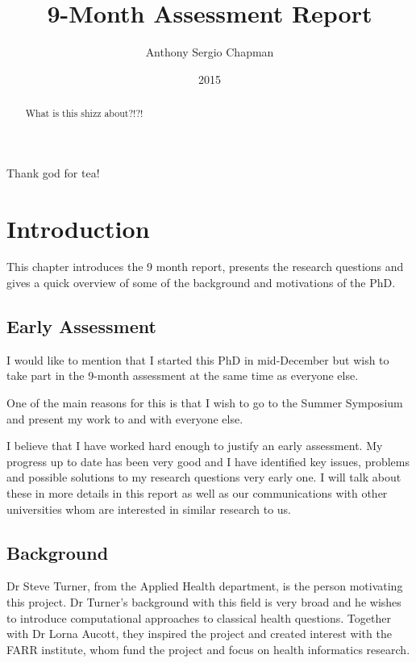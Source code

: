 \documentclass[bsc]{abdnthesis}
\author{Anthony Sergio Chapman}
\title{9-Month Assessment Report}
\date{2015}
\begin{document}
\maketitle
\makedeclaration


\begin{abstract}
  What is this shizz about?!?!
\end{abstract}

\begin{acknowledgements}
  Thank god for tea!
\end{acknowledgements}

\tableofcontents


\chapter{Introduction}
This chapter introduces the 9 month report, presents the research questions and gives a quick overview of some of the background and motivations of the PhD. 

\section{Early Assessment} %
\label{sec:early_assessment}
I would like to mention that I started this PhD in mid-December but wish to take part in the 9-month assessment at the same time as everyone else. 

One of the main reasons for this is that I wish to go to the Summer Symposium and present my work to and with everyone else. 

I believe that I have worked hard enough to justify an early assessment. My progress up to date has been very good and I have identified key issues, problems and possible solutions to my research questions very early one. I will talk about these in more details in this report as well as our communications with other universities whom are interested in similar research to us.
\section{Background} %
\label{sec:background}
Dr Steve Turner, from the Applied Health department, is the person motivating this project. Dr Turner's background with this field is very broad and he wishes to introduce computational approaches to classical health questions. Together with Dr Lorna Aucott, they inspired the project and created interest with the FARR institute, whom fund the project and focus on health informatics research. 
\end{document}
